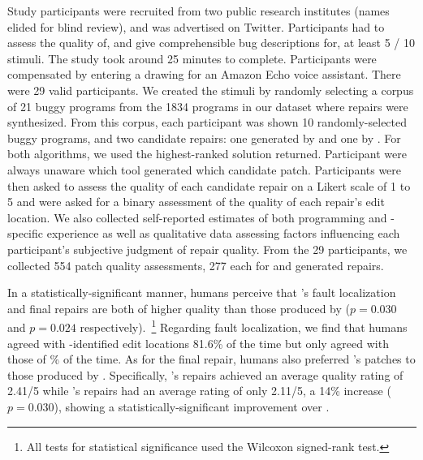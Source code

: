 %
Study participants were recruited from two public research
institutes (names elided for blind review), and was advertised on Twitter.
%
Participants had to assess the quality of, and give comprehensible
bug descriptions for, at least 5 / 10 stimuli. The study took around
25 minutes to complete. Participants were compensated by entering a
drawing for an Amazon Echo voice assistant. There were 29 valid participants.
%
We created the stimuli by randomly selecting a corpus of 21 buggy programs
from the 1834 programs in our dataset where repairs were synthesized.
%
From this corpus, each participant was shown 10 randomly-selected buggy
programs, and two candidate repairs: one generated by \toolname and one
by \seminal.
%
For both algorithms, we used the highest-ranked solution returned.
%
Participant were always unaware which tool generated which candidate
patch.
%
Participants were then asked to assess the quality of each
candidate repair on a Likert scale of 1 to 5 and were asked
for a binary assessment of the quality of each repair's edit
location.
%
We also collected self-reported estimates of both programming and
\ocaml-specific experience as well as qualitative data assessing factors
influencing each participant's subjective judgment of repair quality.
%
From the 29 participants, we collected 554 patch quality assessments,
277 each for \toolname and \seminal generated repairs.


%
In a statistically-significant manner, humans perceive that
\toolname's fault localization and final repairs are both
of higher quality than those produced by \seminal ($p=0.030$
and $p=0.024$ respectively).~\footnote{All tests for statistical
significance used the Wilcoxon signed-rank test.}
%
Regarding fault localization, we find that humans agreed
with \toolname-identified edit locations 81.6\% of the time
but only agreed with those of \% of the time.
%
%
As for the final repair, humans also preferred \toolname's patches
to those produced by \seminal. Specifically, \toolname's repairs
achieved an average quality rating of 2.41/5 while \seminal's
repairs had an average rating of only 2.11/5, a 14\% increase ($p=0.030$),
showing a statistically-significant improvement over \seminal.


